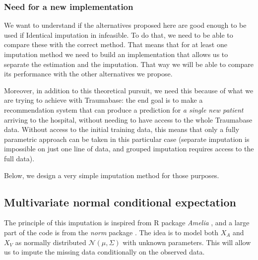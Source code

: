 			\subsubsection{Need for a new implementation}
We want to understand if the alternatives proposed here are good enough to be used if Identical imputation in infeasible. To do that, we need to be able to compare these with the correct method. That means that for at least one imputation method we need to build an implementation that allows us to separate the estimation and the imputation. That way we will be able to compare its performance with the other alternatives we propose.

Moreover, in addition to this theoretical pursuit, we need this because of what we are trying to achieve with Traumabase: the end goal is to make a recommendation system that can produce a prediction for \emph{a single new patient} arriving to the hospital, without needing to have access to the whole Traumabase data. Without access to the initial training data, this means that only a fully parametric approach can be taken in this particular case (separate imputation is impossible on just one line of data, and grouped imputation requires access to the full data).

Below, we design a very simple imputation method for those purposes.

		\subsection{Multivariate normal conditional expectation}
The principle of this imputation is inspired from R package \emph{Amelia} \cite{ref_amelia}, and a large part of the code is from the \emph{norm} package \cite{pkg_norm}. The idea is to model both $X_A$ and $X_V$ as normally distributed $\mathcal{N}(\mu, \Sigma)$ with unknown parameters. This will allow us to impute the missing data conditionally on the observed data.

